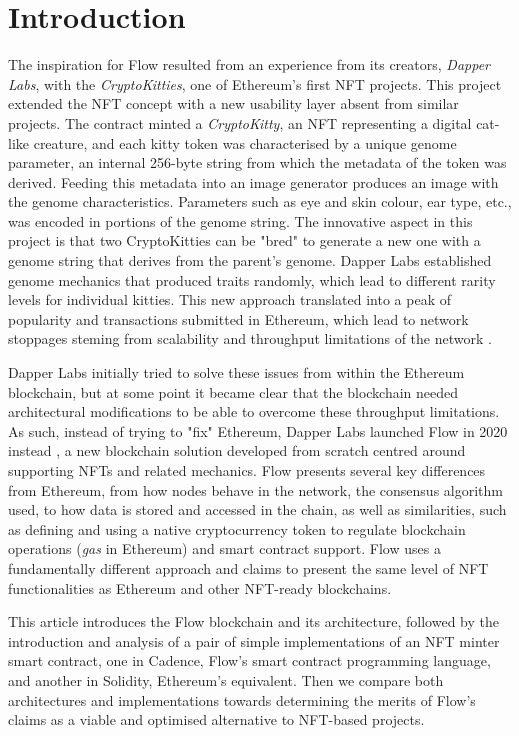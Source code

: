 \documentclass[../NFTComp_IEEE.tex]{subfiles}
\begin{document}
\section{Introduction}
\label{sec:introduction}
The inspiration for Flow resulted from an experience from its creators, \textit{Dapper Labs}, with the \textit{CryptoKitties}, one of Ethereum's first NFT projects. This project extended the NFT concept with a new usability layer absent from similar projects. The contract minted a \textit{CryptoKitty}, an NFT representing a digital cat-like creature, and each kitty token was characterised by a unique genome parameter, an internal 256-byte string from which the metadata of the token was derived. Feeding this metadata into an image generator produces an image with the genome characteristics. Parameters such as eye and skin colour, ear type, etc., was encoded in portions of the genome string. The innovative aspect in this project is that two CryptoKitties can be "bred" to generate a new one with a genome string that derives from the parent's genome. Dapper Labs established genome mechanics that produced traits randomly, which lead to different rarity levels for individual kitties. This new approach translated into a peak of popularity and transactions submitted in Ethereum, which lead to network stoppages steming from scalability and throughput limitations of the network \cite{bbc2017}.
\par
Dapper Labs initially tried to solve these issues from within the Ethereum blockchain, but at some point it became clear that the blockchain needed architectural modifications to be able to overcome these throughput limitations. As such, instead of trying to "fix" Ethereum, Dapper Labs launched Flow in 2020 instead \cite{Gharegozlou2019}, a new blockchain solution developed from scratch centred around supporting NFTs and related mechanics. Flow presents several key differences from Ethereum, from how nodes behave in the network, the consensus algorithm used, to how data is stored and accessed in the chain, as well as similarities, such as defining and using a native cryptocurrency token to regulate blockchain operations (\textit{gas} in Ethereum) and smart contract support. Flow uses a fundamentally different approach and claims to present the same level of NFT functionalities as Ethereum and other NFT-ready blockchains.
\par
This article introduces the Flow blockchain and its architecture, followed by the introduction and analysis of a pair of simple implementations of an NFT minter smart contract, one in Cadence, Flow's smart contract programming language, and another in Solidity, Ethereum's equivalent. Then we compare both architectures and implementations towards determining the merits of Flow's claims as a viable and optimised alternative to NFT-based projects.
\end{document}
